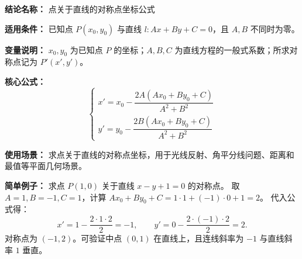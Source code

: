 \textbf{结论名称：} 点关于直线的对称点坐标公式

\textbf{适用条件：} 已知点 \(P(x_0,y_0)\) 与直线 \(l: Ax+By+C=0\)，且 \(A,B\) 不同时为零。

\textbf{变量说明：} \(x_0,y_0\) 为已知点 \(P\) 的坐标；\(A,B,C\) 为直线方程的一般式系数；所求对称点记为 \(P'(x',y')\)。

\textbf{核心公式：} 
\[
\boxed{
\begin{cases}
x' = x_0 - \dfrac{2A(Ax_0+By_0+C)}{A^2+B^2} \\[8pt]
y' = y_0 - \dfrac{2B(Ax_0+By_0+C)}{A^2+B^2}
\end{cases}
}
\]

\textbf{使用场景：} 求点关于直线的对称点坐标，用于光线反射、角平分线问题、距离和最值等平面几何场景。

\textbf{简单例子：} 求点 \(P(1,0)\) 关于直线 \(x-y+1=0\) 的对称点。  
取 \(A=1,B=-1,C=1\)，计算 \(Ax_0+By_0+C = 1\cdot1 + (-1)\cdot0 + 1 = 2\)。  
代入公式得：
\[
x' = 1 - \frac{2\cdot1\cdot2}{2} = -1,\qquad 
y' = 0 - \frac{2\cdot(-1)\cdot2}{2} = 2.
\]
对称点为 \((-1,2)\)。可验证中点 \((0,1)\) 在直线上，且连线斜率为 \(-1\) 与直线斜率 \(1\) 垂直。